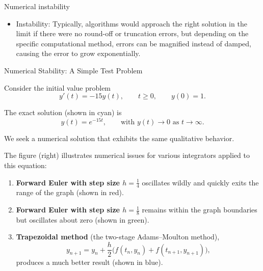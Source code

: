 \documentclass{beamer}
\begin{document}
\begin{frame}{Numerical instability}
\small
\begin{itemize}
    \item Instability: Typically, algorithms would approach the right solution in the limit if there were no round-off or truncation errors,
    but depending on the specific computational method, errors can be magnified instead of damped,
    causing the error to grow exponentially.
\end{itemize}
\end{frame}

\begin{frame}{Numerical Stability: A Simple Test Problem}
\footnotesize

Consider the initial value problem
\begin{equation}
y'(t) = -15y(t), \qquad t \ge 0, \qquad y(0)=1.
\tag{1}
\end{equation}

\medskip

The exact solution (shown in cyan) is
\begin{equation}
y(t) = e^{-15t}, \qquad \text{with } y(t)\to 0 \text{ as } t\to \infty.
\tag{2}
\end{equation}

\medskip

We seek a numerical solution that exhibits the same qualitative behavior.

\medskip

The figure (right) illustrates numerical issues for various integrators applied to this equation:

\begin{enumerate}
    \item \textbf{Forward Euler with step size $h=\tfrac14$} oscillates wildly and quickly exits the range of the graph (shown in red).
    \item \textbf{Forward Euler with step size $h=\tfrac18$} remains within the graph boundaries but oscillates about zero (shown in green).
    \item \textbf{Trapezoidal method} (the two-stage Adams--Moulton method),
    \begin{equation}
    y_{n+1}
    =
    y_n
    + \frac{h}{2}\bigl(f(t_n,y_n) + f(t_{n+1},y_{n+1})\bigr),
    \tag{3}
    \end{equation}
    produces a much better result (shown in blue).
\end{enumerate}

\end{frame}
\end{document}
